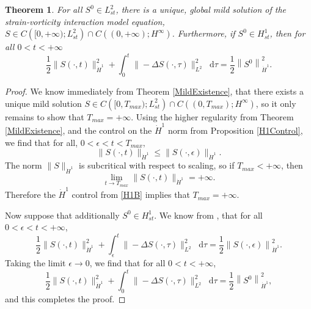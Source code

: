 \documentclass[11pt]{article}
\theoremstyle{plain}
\newtheorem{theorem}{Theorem}[section]
\theoremstyle{remark}
\numberwithin{equation}{section}
\newcommand{\diff}{\mathop{}\!\mathrm{d}}
\begin{document}
\begin{theorem} \label{StrainVortGlobalExist}
For all $S^0 \in L^2_{st}$, there is a unique, global mild solution of the strain-vorticity interaction model equation,
$S\in C\left([0,+\infty);L^2_{st}\right) \cap 
C\left((0,+\infty);H^\infty\right)$.
Furthermore, if $S^0\in H^1_{st}$,
then for all $0<t<+\infty$
\begin{equation}
    \frac{1}{2}\|S(\cdot,t)\|_{\dot{H}^1}^2+
    \int_0^t\|-\Delta S(\cdot,\tau)\|_{L^2}^2 \diff\tau
    =
    \frac{1}{2}\left\|S^0\right\|_{\dot{H}^1}^2.
\end{equation}
\end{theorem}

\begin{proof}
We know immediately from Theorem \ref{MildExistence}, that there exists a unique mild solution
$S\in C\left([0,T_{max});L^2_{st}\right) \cap 
C\left((0,T_{max});H^\infty\right)$,
so it only remains to show that $T_{max}=+\infty.$
Using the higher regularity from Theorem \ref{MildExistence}, and the control on the $\dot{H}^1$ norm from Proposition \ref{H1Control}, we find that for all, $0<\epsilon<t<T_{max},$
\begin{equation} \label{H1B}
    \|S(\cdot,t)\|_{\dot{H}^1} \leq 
    \|S(\cdot,\epsilon)\|_{\dot{H}^1}.
\end{equation}
The norm $\|S\|_{\dot{H}^1}$ is subcritical with respect to scaling, so if $T_{max}<+\infty$, then
\begin{equation}
    \lim_{t\to T_{max}}\|S(\cdot,t)\|_{\dot{H}^1}=+\infty.
\end{equation}
Therefore the $\dot{H}^1$ control from \eqref{H1B} 
implies that $T_{max}=+\infty.$



Now suppose that additionally $S^0\in H^1_{st}$.
We know from , that for all $0<\epsilon<t<+\infty$,
\begin{equation}
    \frac{1}{2}\|S(\cdot,t)\|_{\dot{H}^1}^2+
    \int_\epsilon^{t}\|-\Delta S(\cdot,\tau)\|_{L^2}^2 \diff\tau
    =
    \frac{1}{2}\left\|S(\cdot,\epsilon)
    \right\|_{\dot{H}^1}^2.
\end{equation}
Taking the limit $\epsilon\to 0$, we find that
for all $0<t<+\infty$,
\begin{equation}
    \frac{1}{2}\|S(\cdot,t)\|_{\dot{H}^1}^2+
    \int_0^t\|-\Delta S(\cdot,\tau)\|_{L^2}^2 \diff\tau
    =
    \frac{1}{2}\left\|S^0\right\|_{\dot{H}^1}^2,
\end{equation}
and this completes the proof.
\end{proof}
\end{document}
